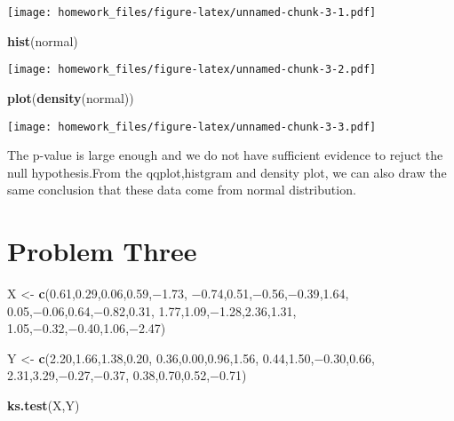 \documentclass[]{article}
\newenvironment{Shaded}{\begin{snugshade}}{\end{snugshade}}
\newcommand{\KeywordTok}[1]{\textcolor[rgb]{0.13,0.29,0.53}{\textbf{#1}}}
\newcommand{\FloatTok}[1]{\textcolor[rgb]{0.00,0.00,0.81}{#1}}
\newcommand{\StringTok}[1]{\textcolor[rgb]{0.31,0.60,0.02}{#1}}
\newcommand{\NormalTok}[1]{#1}
\begin{document}
\texttt{[image: homework\_files/figure-latex/unnamed-chunk-3-1.pdf]}

\begin{Shaded}
\begin{Highlighting}[]
\KeywordTok{hist}\NormalTok{(normal)}
\end{Highlighting}
\end{Shaded}

\texttt{[image: homework\_files/figure-latex/unnamed-chunk-3-2.pdf]}

\begin{Shaded}
\begin{Highlighting}[]
\KeywordTok{plot}\NormalTok{(}\KeywordTok{density}\NormalTok{(normal))}
\end{Highlighting}
\end{Shaded}

\texttt{[image: homework\_files/figure-latex/unnamed-chunk-3-3.pdf]}

The p-value is large enough and we do not have sufficient evidence to
rejuct the null hypothesis.From the qqplot,histgram and density plot, we
can also draw the same conclusion that these data come from normal
distribution.

\section{Problem Three}\label{problem-three}

\begin{Shaded}
\begin{Highlighting}[]
\NormalTok{X <-}\StringTok{ }\KeywordTok{c}\NormalTok{(}\FloatTok{0.61}\NormalTok{,}\FloatTok{0.29}\NormalTok{,}\FloatTok{0.06}\NormalTok{,}\FloatTok{0.59}\NormalTok{,−}\FloatTok{1.73}\NormalTok{,}
\NormalTok{−}\FloatTok{0.74}\NormalTok{,}\FloatTok{0.51}\NormalTok{,−}\FloatTok{0.56}\NormalTok{,−}\FloatTok{0.39}\NormalTok{,}\FloatTok{1.64}\NormalTok{,}
\FloatTok{0.05}\NormalTok{,−}\FloatTok{0.06}\NormalTok{,}\FloatTok{0.64}\NormalTok{,−}\FloatTok{0.82}\NormalTok{,}\FloatTok{0.31}\NormalTok{,}
\FloatTok{1.77}\NormalTok{,}\FloatTok{1.09}\NormalTok{,−}\FloatTok{1.28}\NormalTok{,}\FloatTok{2.36}\NormalTok{,}\FloatTok{1.31}\NormalTok{,}
\FloatTok{1.05}\NormalTok{,−}\FloatTok{0.32}\NormalTok{,−}\FloatTok{0.40}\NormalTok{,}\FloatTok{1.06}\NormalTok{,−}\FloatTok{2.47}\NormalTok{)}

\NormalTok{Y <-}\StringTok{ }\KeywordTok{c}\NormalTok{(}\FloatTok{2.20}\NormalTok{,}\FloatTok{1.66}\NormalTok{,}\FloatTok{1.38}\NormalTok{,}\FloatTok{0.20}\NormalTok{,}
\FloatTok{0.36}\NormalTok{,}\FloatTok{0.00}\NormalTok{,}\FloatTok{0.96}\NormalTok{,}\FloatTok{1.56}\NormalTok{,}
\FloatTok{0.44}\NormalTok{,}\FloatTok{1.50}\NormalTok{,−}\FloatTok{0.30}\NormalTok{,}\FloatTok{0.66}\NormalTok{,}
\FloatTok{2.31}\NormalTok{,}\FloatTok{3.29}\NormalTok{,−}\FloatTok{0.27}\NormalTok{,−}\FloatTok{0.37}\NormalTok{,}
\FloatTok{0.38}\NormalTok{,}\FloatTok{0.70}\NormalTok{,}\FloatTok{0.52}\NormalTok{,−}\FloatTok{0.71}\NormalTok{)}

\KeywordTok{ks.test}\NormalTok{(X,Y)}
\end{Highlighting}
\end{Shaded}
\end{document}
